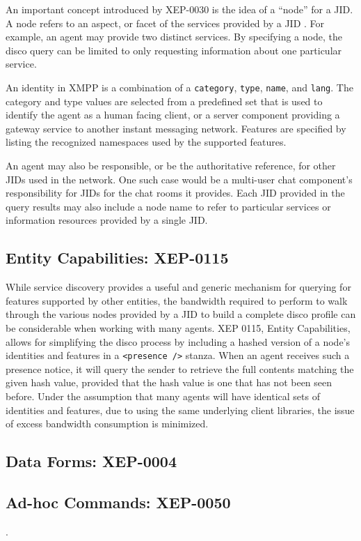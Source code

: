 An important concept introduced by XEP-0030 is the idea of a ``node'' for a JID. A node
refers to an aspect, or facet of the services provided by a JID \cite{XEP-0030}. For
example, an agent may provide two distinct services. By specifying a node, the disco
query can be limited to only requesting information about one particular service.

An identity in XMPP is a combination of a \texttt{category}, \texttt{type}, \texttt{name}, and
\texttt{lang}. The category and type values are selected from a predefined set that is used
to identify the agent as a human facing client, or a server component providing a gateway
service to another instant messaging network. Features are specified by listing the 
recognized namespaces used by the supported features.

An agent may also be responsible, or be the authoritative reference, for other JIDs used
in the network. One such case would be a multi-user chat component's responsibility for
JIDs for the chat rooms it provides. Each JID provided in the query results may also 
include a node name to refer to particular services or information resources provided
by a single JID.

\subsection{Entity Capabilities: XEP-0115}
\label{sec:Entity-Capabilities}

While service discovery provides a useful and generic mechanism for querying
for features supported by other entities, the bandwidth required to perform
to walk through the various nodes provided by a JID to build a complete disco
profile can be considerable when working with many agents. XEP 0115, Entity
Capabilities, allows for simplifying the disco process by including a hashed
version of a node's identities and features in a \texttt{<presence />} stanza.
When an agent receives such a presence notice, it will query the sender to
retrieve the full contents matching the given hash value, provided that the
hash value is one that has not been seen before. Under the assumption that many
agents will have identical sets of identities and features, due to using the
same underlying client libraries, the issue of excess bandwidth consumption is
minimized.

\subsection{Data Forms: XEP-0004}
\label{sec:Data-Forms}


\subsection{Ad-hoc Commands: XEP-0050}.
\label{sec:Adhoc-Commands}


